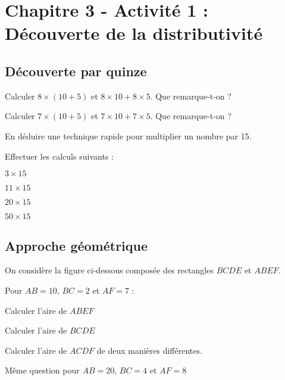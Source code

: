 \section*{Chapitre 3 - Activité 1 : Découverte de la distributivité}

\subsection*{Découverte par quinze}

\cnt Calculer $8\times (10+5)$ et $8\times 10 + 8 \times 5$. Que remarque-t-on ?

\cnt Calculer $7\times (10+5)$ et $7\times 10 + 7 \times 5$. Que remarque-t-on ?

\cnt En déduire une technique rapide pour multiplier un nombre par 15.

\cnt Effectuer les calculs suivants :

\begin{multicols}{4}
    $3\times 15$

    $11\times 15$

    $20\times 15$

    $50\times 15$
\end{multicols}

\subsection*{Approche géométrique}

On considère la figure ci-dessous composée des rectangles $BCDE$ et $ABEF$.



\begin{minipage}[m]{0.35\textwidth}
    \begin{figure}[H]
        \centering
    \end{figure}
\end{minipage}
\hfill
\begin{minipage}[m]{0.6\textwidth}
    Pour $AB=10$, $BC=2$ et $AF=7$ :
    
    \cnt Calculer l'aire de $ABEF$
    
    \cnt Calculer l'aire de $BCDE$
    
    \cnt Calculer l'aire de $ACDF$ de deux manières différentes.
    
    \cnt Même question pour $AB=20$, $BC=4$ et $AF=8$
\end{minipage}

